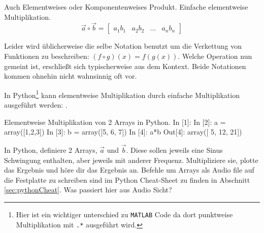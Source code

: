 Auch Elementweises oder Komponentenweises Produkt. Einfache elementweise Multiplikation.
$$ \vec{a}\circ \vec{b} = \begin{bmatrix}a_1b_1 & a_2b_2 & \dots & a_n b_n\end{bmatrix}$$ 

Leider wird üblicherweise die selbe Notation benutzt um die Verkettung von Funktionen zu beschreiben: $(f \circ g)(x) = f(g(x))$. Welche Operation nun gemeint ist, erschließt sich typischerweise aus dem Kontext. Beide Notationen kommen ohnehin nicht wahnsinnig oft vor.

In Python\footnote{Hier ist ein wichtiger unterschied zu \texttt{MATLAB} Code da dort punktweise Multiplikation mit \texttt{.*} ausgeführt wird.} kann elementweise Multiplikation durch einfache Multiplikation ausgeführt werden: .

\begin{python}{Elementweise Multiplikation von 2 Arrays in Python.}
In [1]: %
In [2]: a = array([1,2,3])
In [3]: b = array([5, 6, 7])
In [4]: a*b
Out[4]: array([ 5, 12, 21])
\end{python}

\begin{question}
In Python, definiere 2 Arrays, $\vec{a}$ und $\vec{b}$. Diese sollen jeweils eine Sinus Schwingung enthalten, aber jeweils mit anderer Frequenz. Multipliziere sie, plotte das Ergebnis und höre dir das Ergebnis an. Befehle um Arrays als Audio file auf die Festplatte zu schreiben sind im Python Cheat-Sheet zu finden in Abschnitt \ref{sec:pythonCheat}. Was passiert hier aus Audio Sicht?
\end{question}

